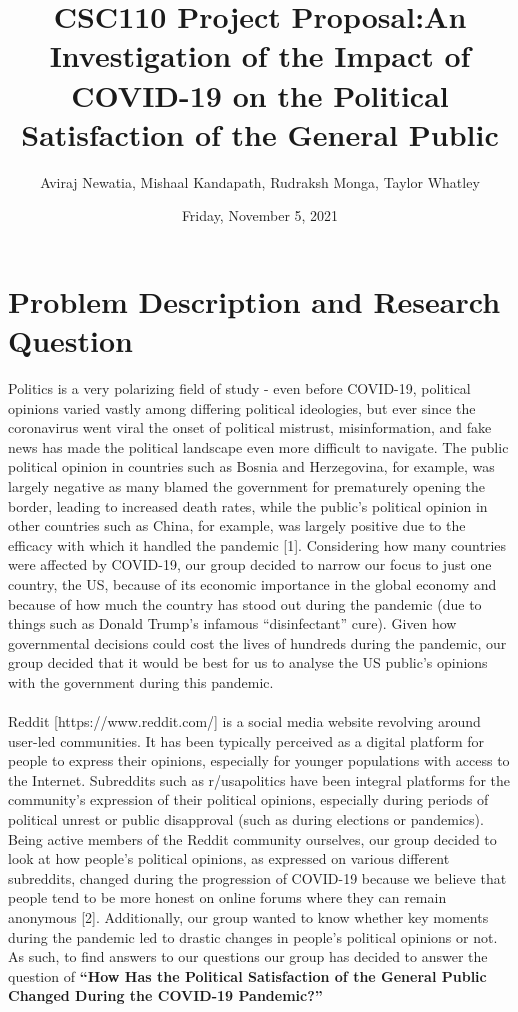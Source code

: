 \documentclass[fontsize=11pt]{article}
\title{CSC110 Project Proposal:An Investigation of the Impact of COVID-19 on the  Political Satisfaction of the General Public}
\author{Aviraj Newatia, Mishaal Kandapath, Rudraksh Monga, Taylor Whatley}
\date{Friday, November 5, 2021}
\begin{document}
\maketitle

\section*{Problem Description and Research Question}

Politics is a very polarizing field of study - even before COVID-19, political opinions varied vastly among differing political ideologies, but ever since the coronavirus went viral the onset of political mistrust, misinformation, and fake news has made the political landscape even more difficult to navigate. The public political opinion in countries such as Bosnia and Herzegovina, for example, was largely negative as many blamed the government for prematurely opening the border, leading to increased death rates, while the public’s political opinion in other countries such as China, for example, was largely positive due to the efficacy with which it handled the pandemic [1]. Considering how many countries were affected by COVID-19, our group decided to narrow our focus to just one country, the US, because of its economic importance in the global economy and because of how much the country has stood out during the pandemic (due to things such as Donald Trump’s infamous “disinfectant” cure). Given how governmental decisions could cost the lives of hundreds during the pandemic, our group decided that it would be best for us to analyse the US public’s opinions with the government during this pandemic. 
\\\\
Reddit [https://www.reddit.com/] is a social media website revolving around user-led communities. It has been typically perceived as a digital platform for people to express their opinions, especially for younger populations with access to the Internet. Subreddits such as r/usapolitics have been integral platforms for the community’s expression of their political opinions, especially during periods of political unrest or public disapproval (such as during elections or pandemics). Being active members of the Reddit community ourselves, our group decided to look at how people’s political opinions, as expressed on various different subreddits, changed during the progression of COVID-19 because we believe that people tend to be more honest on online forums where they can remain anonymous [2]. Additionally, our group wanted to know whether key moments during the pandemic led to drastic changes in people’s political opinions or not. As such, to find answers to our questions our group has decided to answer the question of \textbf{“How Has the Political Satisfaction of the General Public Changed During the COVID-19 Pandemic?”}
\end{document}
